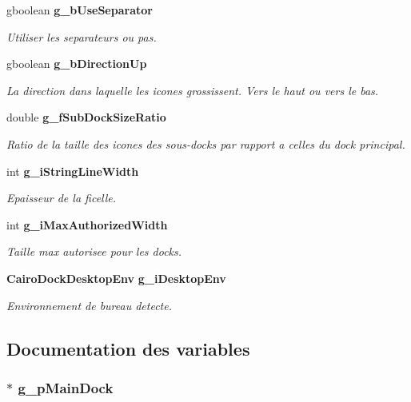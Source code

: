 \begin{CompactItemize}
gboolean {\bf g\_\-bUseSeparator}
\begin{CompactList}\small\item\em Utiliser les separateurs ou pas. \item\end{CompactList}\item 
gboolean {\bf g\_\-bDirectionUp}
\begin{CompactList}\small\item\em La direction dans laquelle les icones grossissent. Vers le haut ou vers le bas. \item\end{CompactList}\item 
double {\bf g\_\-fSubDockSizeRatio}
\begin{CompactList}\small\item\em Ratio de la taille des icones des sous-docks par rapport a celles du dock principal. \item\end{CompactList}\item 
int {\bf g\_\-iStringLineWidth}
\begin{CompactList}\small\item\em Epaisseur de la ficelle. \item\end{CompactList}\item 
int {\bf g\_\-iMaxAuthorizedWidth}
\begin{CompactList}\small\item\em Taille max autorisee pour les docks. \item\end{CompactList}\item 
{\bf CairoDockDesktopEnv} {\bf g\_\-iDesktopEnv}
\begin{CompactList}\small\item\em Environnement de bureau detecte. \item\end{CompactList}\end{CompactItemize}


\subsection{Documentation des variables}
\subsubsection{$\ast$ {\bf g\_\-pMainDock}}\label{cairo-dock-global-variables_8h_a24af9062f9cc975eb0b9422eb6587e6}


